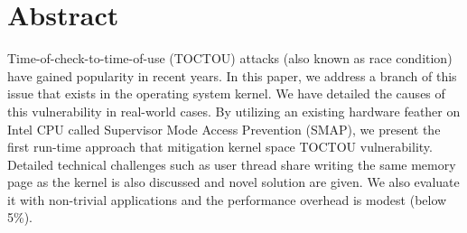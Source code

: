 \section{Abstract}

Time-of-check-to-time-of-use (TOCTOU) attacks (also known as race condition) have gained popularity in recent years. In this paper, we address a branch of this issue that exists in the operating system kernel. We have detailed the causes of this vulnerability in real-world cases. By utilizing an existing hardware feather on Intel CPU called Supervisor Mode Access Prevention (SMAP),  we present the first run-time approach that mitigation kernel space TOCTOU vulnerability. Detailed technical challenges such as user thread share writing the same memory page as the kernel is also discussed and novel solution are given. We also evaluate it with non-trivial applications and the performance overhead is modest (below 5\%).  

